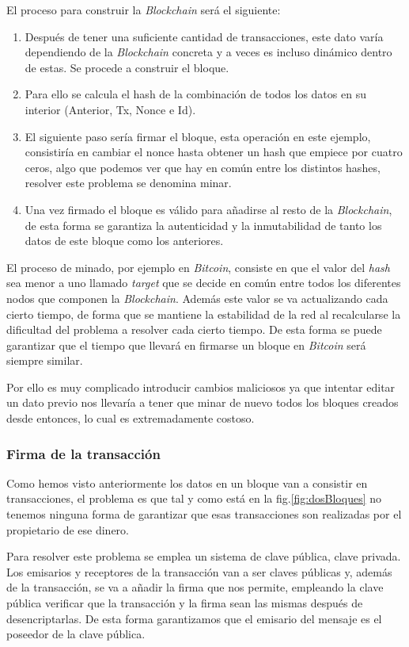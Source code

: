 El proceso para construir la \textit{Blockchain} será el siguiente:
\begin{enumerate}
\item Después de tener una suficiente cantidad de transacciones, este dato varía dependiendo de la \textit{Blockchain} concreta y a veces es incluso dinámico dentro de estas. Se procede a construir el bloque.
\item Para ello se calcula el hash de la combinación de todos los datos en su interior (Anterior, Tx, Nonce e Id).
\item El siguiente paso sería firmar el bloque, esta operación en este ejemplo, consistiría en cambiar el nonce hasta obtener un hash que empiece por cuatro ceros, algo que podemos ver que hay en común entre los distintos hashes, resolver este problema se denomina minar.
\item Una vez firmado el bloque es válido para añadirse al resto de la \textit{Blockchain}, de esta forma se garantiza la autenticidad y la inmutabilidad de tanto los datos de este bloque como los anteriores.
\end{enumerate}

El proceso de minado, por ejemplo en \textit{Bitcoin}, consiste en que el valor del \textit{hash} sea menor a uno llamado \textit{target} que se decide en común entre todos los diferentes nodos que componen la \textit{Blockchain}. Además este valor se va actualizando cada cierto tiempo, de forma que se mantiene la estabilidad de la red al recalcularse la dificultad del problema a resolver cada cierto tiempo. De esta forma se puede garantizar que el tiempo que llevará en firmarse un bloque en \textit{Bitcoin} será siempre similar.

Por ello es muy complicado introducir cambios maliciosos ya que intentar editar un dato previo nos llevaría a tener que minar de nuevo todos los bloques creados desde entonces, lo cual es extremadamente costoso.

\subsubsection{Firma de la transacción}

Como hemos visto anteriormente los datos en un bloque van a consistir en transacciones, el problema es que tal y como está en la fig.\ref{fig:dosBloques} no tenemos ninguna forma de garantizar que esas transacciones son realizadas por el propietario de ese dinero. 

Para resolver este problema se emplea un sistema de clave pública, clave privada. Los emisarios y receptores de la transacción van a ser claves públicas y, además de la transacción, se va a añadir la firma que nos permite, empleando la clave pública verificar que la transacción y la firma sean las mismas después de desencriptarlas. De esta forma garantizamos que el emisario del mensaje es el poseedor de la clave pública.

